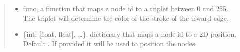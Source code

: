 \documentclass[letterpaper,10pt,english]{sphinxmanual}
\begin{document}
\begin{fulllineitems}
\begin{fulllineitems}
\begin{quote}
\begin{description}
\begin{itemize}
\item {} 
 \textendash{} func, a function that maps a node id to a triplet between 0 and 255.
The triplet will determine the color of the stroke of the inward edge.

\item {} 
 \textendash{} \{int: {[}float, float{]}, …\}, dictionary that maps a node id to a 2D position.
Default . If provided it will be used to position the nodes.

\end{itemize}

\end{description}\end{quote}

\end{fulllineitems}


\end{fulllineitems}




\renewcommand{\indexname}{Index}
\printindex
\end{document}
